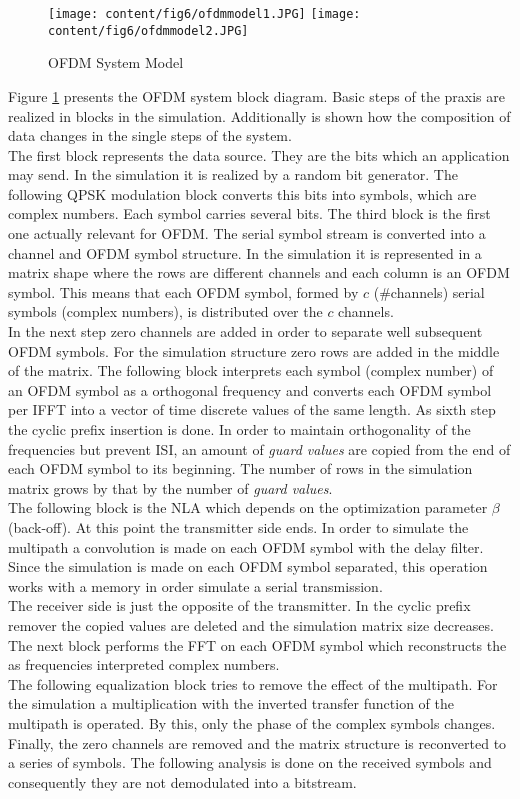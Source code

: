 \begin{figure}[tbp]
\centering
\texttt{[image: content/fig6/ofdmmodel1.JPG]}
\texttt{[image: content/fig6/ofdmmodel2.JPG]}
\caption{OFDM System Model}
\label{fig_ofdmsystemmodel}
\end{figure}

Figure \ref{fig_ofdmsystemmodel} presents the OFDM system block diagram.
Basic steps of the praxis are realized in blocks in the simulation. Additionally is shown how the composition of data changes in the single steps of the system.\\
The first block represents the data source. They are the bits which an application may send. In the simulation it is realized by a random bit generator. The following QPSK modulation block converts this bits into symbols, which are complex numbers. Each symbol carries several bits. The third block is the first one actually relevant for OFDM. The serial symbol stream is converted into a channel and OFDM symbol structure. In the simulation it is represented in a matrix shape where the rows are different channels and each column is an OFDM symbol. This means that each OFDM symbol, formed by $c$ (\#channels) serial symbols (complex numbers), is distributed over the $c$ channels.\\
In the next step zero channels are added in order to separate well subsequent OFDM symbols. For the simulation structure zero rows are added in the middle of the matrix. The following block interprets each symbol (complex number) of an OFDM symbol as a orthogonal frequency and converts each OFDM symbol per IFFT into a vector of time discrete values of the same length. As sixth step the cyclic prefix insertion is done. In order to maintain orthogonality of the frequencies but prevent ISI, an amount of \textit{guard values} are copied from the end of each OFDM symbol to its beginning. The number of rows in the simulation matrix grows by that by the number of \textit{guard values}.\\
The following block is the NLA which depends on the optimization parameter $\beta$ (back-off). At this point the transmitter side ends. In order to simulate the multipath a convolution is made on each OFDM symbol with the delay filter. Since the simulation is made on each OFDM symbol separated, this operation works with a memory in order simulate a serial transmission.\\
The receiver side is just the opposite of the transmitter. In the cyclic prefix remover the copied values are deleted and the simulation matrix size decreases. The next block performs the FFT on each OFDM symbol which reconstructs the as frequencies interpreted complex numbers.\\ The following equalization block tries to remove the effect of the multipath. For the simulation a multiplication with the inverted transfer function of the multipath is operated. By this, only the phase of the complex symbols changes.\\ Finally, the zero channels are removed and the matrix structure is reconverted to a series of symbols. The following analysis is done on the received symbols and consequently they are not demodulated into a bitstream.